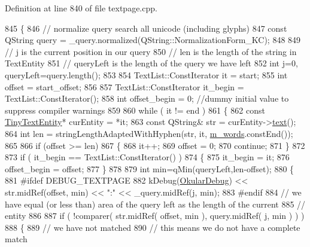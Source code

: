 Definition at line 840 of file textpage.\+cpp.


\begin{DoxyCode}
845 \{
846     \textcolor{comment}{// normalize query search all unicode (including glyphs)}
847     \textcolor{keyword}{const} QString query = \_query.normalized(QString::NormalizationForm\_KC);
848 
849     \textcolor{comment}{// j is the current position in our query}
850     \textcolor{comment}{// len is the length of the string in TextEntity}
851     \textcolor{comment}{// queryLeft is the length of the query we have left}
852     \textcolor{keywordtype}{int} j=0, queryLeft=query.length();
853 
854     TextList::ConstIterator it = start;
855     \textcolor{keywordtype}{int} offset = start\_offset;
856 
857     TextList::ConstIterator it\_begin = TextList::ConstIterator();
858     \textcolor{keywordtype}{int} offset\_begin = 0; \textcolor{comment}{//dummy initial value to suppress compiler warnings}
859 
860     \textcolor{keywordflow}{while} ( it != end )
861     \{
862         \textcolor{keyword}{const} \hyperlink{classTinyTextEntity}{TinyTextEntity}* curEntity = *it;
863         \textcolor{keyword}{const} QString& str = curEntity->\hyperlink{classTinyTextEntity_a9657105c457630e898ea823ddc87d278}{text}();
864         \textcolor{keywordtype}{int} len = stringLengthAdaptedWithHyphen(str, it, \hyperlink{classOkular_1_1TextPagePrivate_a36b703334a8775136cb4308209afd1cb}{m\_words}.constEnd());
865 
866         \textcolor{keywordflow}{if} (offset >= len)
867         \{
868             it++;
869             offset = 0;
870             \textcolor{keywordflow}{continue};
871         \}
872 
873         \textcolor{keywordflow}{if} ( it\_begin == TextList::ConstIterator() )
874         \{
875             it\_begin = it;
876             offset\_begin = offset;
877         \}
878 
879         \textcolor{keywordtype}{int} min=qMin(queryLeft,len-offset);
880         \{
881 \textcolor{preprocessor}{#ifdef DEBUG\_TEXTPAGE}
882             kDebug(\hyperlink{debug__p_8h_af16c6e32a95969dd0605d792ec9807c7}{OkularDebug}) << str.midRef(offset, min) << \textcolor{stringliteral}{":"} << \_query.midRef(j, min);
883 \textcolor{preprocessor}{#endif}
884             \textcolor{comment}{// we have equal (or less than) area of the query left as the length of the current }
885             \textcolor{comment}{// entity}
886 
887             \textcolor{keywordflow}{if} ( !comparer( str.midRef( offset, min ), query.midRef( j, min ) ) )
888             \{
889                     \textcolor{comment}{// we have not matched}
890                     \textcolor{comment}{// this means we do not have a complete match}

\end{DoxyCode}
